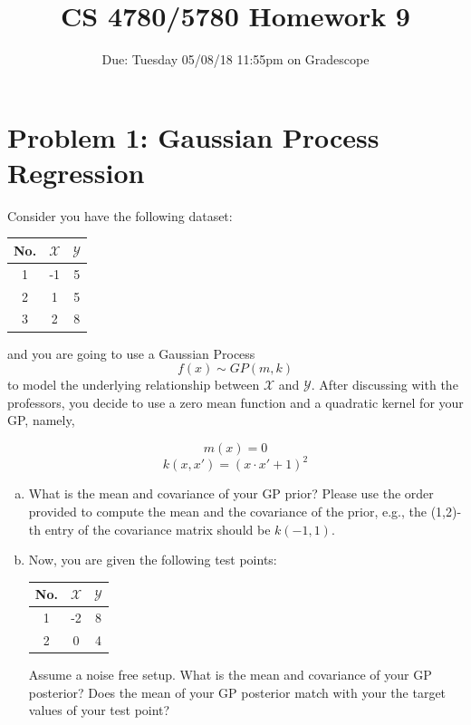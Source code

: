 \documentclass{article}
\title{CS 4780/5780 Homework 9\vspace{-10pt}}
\author{Due: Tuesday 05/08/18 11:55pm on Gradescope}
\date{}
\begin{document}
    \maketitle
    \section*{Problem 1: Gaussian Process Regression} 
    Consider you have the following dataset: 
    \begin{table}[h]
    \centering
    \begin{tabular}{|c|c|c|}
        \hline
        No.& $\mathcal{X}$ & $\mathcal{Y}$ \\
        \hline
        1 & -1 & 5 \\
        2 & 1 & 5 \\
        3 & 2 & 8 \\
        \hline
    \end{tabular}
    \end{table}
    \newline
    and you are going to use a Gaussian Process
    $$f(x) \sim GP (m, k)$$ to model the underlying relationship between $\mathcal{X}$ and $\mathcal{Y}$. 
    After discussing with the professors, you decide to use a zero mean function and a quadratic kernel 
    for your GP, namely, 

    $$m(x) = 0$$
    $$k(x, x') = (x \cdot x' + 1)^2$$

    \begin{enumerate}[(a)]
        \item What is the mean and covariance of your GP prior? Please use the order provided to compute
        the mean and the covariance of the prior, e.g., the (1,2)-th entry of the 
        covariance matrix should be $k(-1, 1)$. 
        \item Now, you are given the following test points:
            \begin{table}[h]
                \centering
                \begin{tabular}{|c|c|c|}
                    \hline
                    No.& $\mathcal{X}$ & $\mathcal{Y}$ \\
                    \hline
                    1 & -2 & 8 \\
                    2 & 0 & 4 \\
                    \hline
                \end{tabular}
               \end{table}
        \newline
        Assume a noise free setup. What is the mean and covariance of your GP posterior? 
        Does the mean of your GP posterior match with your the target values of your test point? 
    \end{enumerate}
    \newpage
\end{document}

